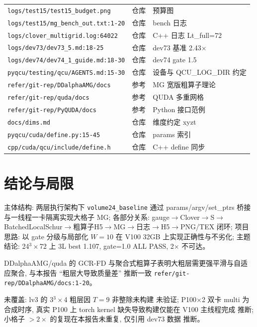 \documentclass[UTF8]{ctexart}
\begin{document}
\begin{xltabular}{\textwidth}{llX}
\texttt{\nolinkurl{logs/test15/test15_budget.png}} & 仓库 & 预算图 \\
\texttt{\nolinkurl{logs/test15/mg_bench_out.txt:1-20}} & 仓库 & bench 日志 \\
\texttt{\nolinkurl{logs/clover_multigrid.log:64022}} & 仓库 & C++ 日志 Lt\_full=72 \\
\texttt{\nolinkurl{logs/dev73/dev73_5.md:18-25}} & 仓库 & dev73 基准 2.43$\times$ \\
\texttt{\nolinkurl{logs/dev74/dev74_1_guide.md:18-30}} & 仓库 & dev74 gate 1.5 \\
\texttt{\nolinkurl{pyqcu/testing/qcu/AGENTS.md:15-30}} & 仓库 & 设备与 QCU\_LOG\_DIR 约定 \\
\texttt{\nolinkurl{refer/git-rep/DDalphaAMG/docs}} & 参考 & MG 宽版粗算子理论 \\
\texttt{\nolinkurl{refer/git-rep/quda/docs}} & 参考 & QUDA 多重网格 \\
\texttt{\nolinkurl{refer/git-rep/PyQUDA/docs}} & 参考 & Python 接口范例 \\
\texttt{\nolinkurl{docs/dims.md}} & 仓库 & 维度约定 xyzt \\
\texttt{\nolinkurl{pyqcu/cuda/define.py:15-45}} & 仓库 & params 索引 \\
\texttt{\nolinkurl{cpp/cuda/qcu/include/define.h}} & 仓库 & C++ define 同步 \\
\bottomrule
\end{xltabular}

\section{结论与局限}
\begin{conclbox}
主体结构: 两层执行架构下 \texttt{\nolinkurl{volume24_baseline}} 通过 params/argv/set\_ptrs 桥接与一线程一卡隔离实现大格子 MG; 各部分关系: gauge$\to$Clover$\to$S$\to$BatchedLocalSchur$\to$粗算子H5$\to$MG$\to$日志$\to$H5$\to$PNG/TEX 闭环; 项目思路: 以 gate 分级与局部化 $W=10$ 在 V100 32GB 上实现正确性与不劣化; 主题结论: 24$^3\times$72 上 3L best 1.107, gate=1.0 ALL PASS, 2$\times$ 不可达。
\end{conclbox}
\begin{refbox}
DDalphaAMG/quda 的 GCR-FD 与聚合式粗算子表明大粗层需更强平滑与自适应聚合, 与本报告 ``粗层大导致质量差'' 推断一致 \textcolor{evidence}{\texttt{\nolinkurl{refer/git-rep/DDalphaAMG/docs:1-20}}}。
\end{refbox}
\begin{warnbox}
未覆盖: lv3 的 3$^3\times$4 粗层因 $T=9$ 非整除未构建 \textcolor{warn}{未验证}; P100$\times$2 双卡 multi 为合成时序, 真实 P100 上 torch kernel 缺失导致构建仅能在 V100 主线程完成 \textcolor{warn}{推断}; 小格子 $>2\times$ 的复现在本报告未重复, 仅引用 dev73 数据 \textcolor{warn}{推断}。
\end{warnbox}
\end{document}
